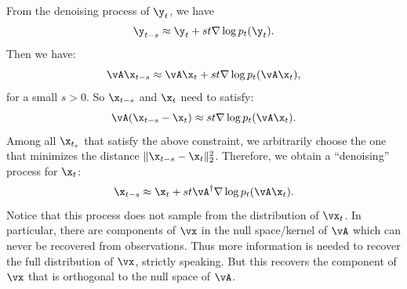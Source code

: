 \documentclass[../../book-main.tex]{subfiles}
\begin{document}
From the denoising process of $\y_t$, we have
\begin{equation}
    \y_{t-s} \approx  \y_t + st \nabla \log p_t(\y_t).
\end{equation}
Then we have:
\begin{equation}
    \vA\x_{t-s} \approx   \vA\x_t + st \nabla \log p_t(\vA \x_t),
\end{equation}
for a small $s >0$. So $\x_{t-s}$ and $\x_t$ need to satisfy:
\begin{equation}
    \vA(\x_{t-s} - \x_t) \approx st \nabla \log p_t(\vA\x_t). 
\end{equation}
Among all $\x_{t_s}$ that satisfy the above constraint, we arbitrarily choose the one that minimizes the distance $\|\x_{t-s} - \x_t\|_2^2$. Therefore, we obtain a ``denoising'' process for $\x_t$:
\begin{equation}
    \x_{t-s}  \approx \x_t + st\vA^\dagger \nabla \log p_t(\vA\x_t). 
\label{eqn:denoising-projection}
\end{equation}
Notice that this process does not sample from the distribution of $\vx_t$. In particular, there are components of $\vx$ in the null space/kernel of $\vA$ which can never be recovered from observations. Thus more information is needed to recover the full distribution of $\vx$, strictly speaking. But this recovers the component of $\vx$ that is orthogonal to the null space of $\vA$.

\end{document}
